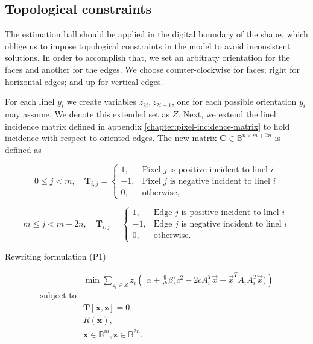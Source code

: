 \subsection{Topological constraints}

The estimation ball should be applied in the digital boundary of the shape, which oblige us to impose topological constraints in the model to avoid inconsistent solutions. In order to accomplish that, we set an arbitraty orientation for the faces and another for the edges. We choose counter-clockwise for faces; right for horizontal edges; and up for vertical edges.


For each linel $y_i$ we create variables $z_{2i},z_{2i+1}$, one for each possible orientation $y_i$ may assume. We denote this extended set as $Z$. Next, we extend the linel incidence matrix defined in appendix \ref{chapter:pixel-incidence-matrix} to hold incidence with respect to oriented edges. The new matrix $\mathbf{C} \in \mathbb{B}^{n \times m + 2n}$ is defined as

\[
	0 \leq j < m, \quad \mathbf{T}_{i,j} = \left\{ \begin{array}{ll}
	
	1,& \text{Pixel $j$ is positive incident to linel $i$}\\
	-1,& \text{Pixel $j$ is negative incident to linel $i$}\\	
	0,& \text{otherwise},
	\end{array}\right.
\]

\[
	m \leq j < m + 2n, \quad \mathbf{T}_{i,j} = \left\{ \begin{array}{ll}
	
	1,& \text{Edge $j$ is positive incident to linel $i$}\\
	-1,& \text{Edge $j$ is negative incident to linel $i$}\\	
	0,& \text{otherwise}.
	\end{array}\right.
\]

Rewriting formulation (P1)

\[
\begin{array}{ll}
& \displaystyle	\min \sum_{z_i \in Z}{ z_i \left(\; \alpha + \frac{9}{r^6}\beta \big(c^2 - 2cA_i^T\vec{x} + \vec{x}^TA_iA_i^T\vec{x}\big)\right)} \\
\text{subject to}\\
&	\mathbf{T}[ \mathbf{x}, \mathbf{z}] = 0,\\
&   R(\mathbf{x}),\\
&   \mathbf{x} \in \mathbb{B}^{m}, \mathbf{z} \in \mathbb{B}^{2n}.
\end{array}
\]


